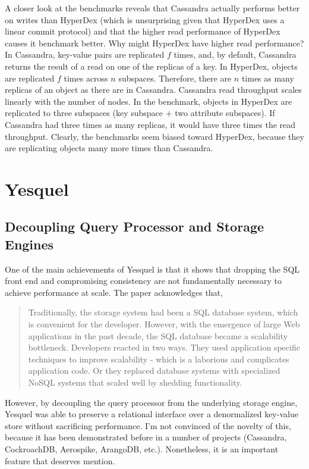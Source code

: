 \documentclass[12pt]{article}
\begin{document}
  A closer look at the benchmarks reveals that Cassandra actually performs better on writes than 
  HyperDex (which is unsurprising given that HyperDex uses a linear commit protocol) and that the 
  higher read performance of HyperDex causes it benchmark better. Why might HyperDex have higher 
  read performance? In Cassandra, key-value pairs are replicated $f$ times, and, by default, 
  Cassandra returns the result of a read on one of the replicas of a key. In HyperDex, objects are 
  replicated $f$ times across $n$ subspaces. Therefore, there are $n$ times as many replicas of an 
  object as there are in Cassandra. Cassandra read throughput scales linearly with the number of 
  nodes. In the benchmark, objects in HyperDex are replicated to three subspaces (key subspace + two 
  attribute subspaces). If Cassandra had three times as many replicas, it would have three times the 
  read throughput. Clearly, the benchmarks seem biased toward HyperDex, because they are replicating 
  objects many more times than Cassandra.

\section{Yesquel}

  \subsection{Decoupling Query Processor and Storage Engines}
  One of the main achievements of Yesquel is that it shows that dropping the SQL front end and 
  compromising consistency are not fundamentally necessary to achieve performance at scale. The
  paper acknowledges that, 
  
    \begin{quote}
    Traditionally, the storage system had been a SQL database system, which is convenient for the
    developer. However, with the emergence of large Web applications in the past decade, the SQL
    database became a scalability bottleneck. Developers reacted in two ways. They used application
    specific techniques to improve scalability - which is a laborious and complicates application
    code. Or they replaced database systems with specialized NoSQL systems that scaled well by
    shedding functionality.
    \end{quote}

  However, by decoupling the query processor from the underlying storage engine, Yesquel was able to
  preserve a relational interface over a denormalized key-value store without sacrificing
  performance. I'm not convinced of the novelty of this, because it has been demonstrated before in
  a number of projects (Cassandra, CockroachDB, Aerospike, ArangoDB, etc.). Nonetheless, it is an
  important feature that deserves mention.  
\end{document}
